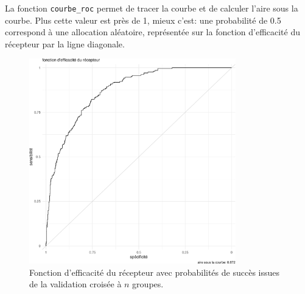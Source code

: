 \documentclass[
  11pt,
  letterpaper,
]{scrbook}
\newenvironment{Shaded}{\begin{snugshade}}{\end{snugshade}}
\newcommand{\AttributeTok}[1]{\textcolor[rgb]{0.40,0.45,0.13}{#1}}
\newcommand{\CommentTok}[1]{\textcolor[rgb]{0.37,0.37,0.37}{#1}}
\newcommand{\ConstantTok}[1]{\textcolor[rgb]{0.56,0.35,0.01}{#1}}
\newcommand{\DocumentationTok}[1]{\textcolor[rgb]{0.37,0.37,0.37}{\textit{#1}}}
\newcommand{\FunctionTok}[1]{\textcolor[rgb]{0.28,0.35,0.67}{#1}}
\newcommand{\NormalTok}[1]{\textcolor[rgb]{0.00,0.23,0.31}{#1}}
\newcommand{\OtherTok}[1]{\textcolor[rgb]{0.00,0.23,0.31}{#1}}
\newcommand{\SpecialCharTok}[1]{\textcolor[rgb]{0.37,0.37,0.37}{#1}}
\theoremstyle{definition}
\theoremstyle{remark}
\begin{document}
La fonction \texttt{courbe\_roc} permet de tracer la courbe et de
calculer l'aire sous la courbe. Plus cette valeur est près de 1, mieux
c'est: une probabilité de 0.5 correspond à une allocation aléatoire,
représentée sur la fonction d'efficacité du récepteur par la ligne
diagonale.

\begin{figure}[ht!]

{\centering \includegraphics[width=0.8\textwidth,height=\textheight]{./05-reglogistique_files/figure-pdf/fig-roccurve-1.pdf}

}

\caption{\label{fig-roccurve}Fonction d'efficacité du récepteur avec
probabilités de succès issues de la validation croisée à \(n\) groupes.}

\end{figure}

\begin{Shaded}
\end{Shaded}
\end{document}
